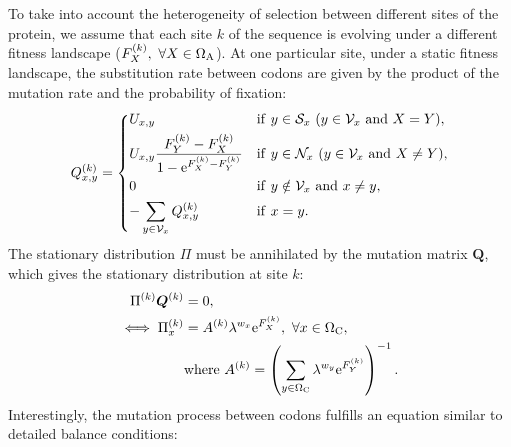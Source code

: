 To take into account the heterogeneity of selection between different sites of the protein, we assume that each site $k$ of the sequence is evolving under a different fitness landscape ($F_X^{(k)}, \ \forall X \in \Omega_{\mathrm{A}} $).
At one particular site, under a static fitness landscape, the \gls{substitution} rate between \glspl{codon} are given by the product of the mutation rate and the probability of fixation:
\begin{equation}
\label{codonSubRates}
Q_{x, y}^{(k)} =
\begin{dcases}
U_{x, y}
& \mathrm{if} \ y \in \mathcal{S}_x \ (y \in \mathcal{V}_x \ \mathrm{and} \ X = Y),  \\
U_{x, y} \dfrac{F_Y^{(k)} - F_X^{(k)}}{1 - \mathrm{e}^{F_X^{(k)} - F_Y^{(k)}}}
& \mathrm{if} \ y \in \mathcal{N}_x \ (y \in \mathcal{V}_x \ \mathrm{and} \ X \neq Y),  \\
0
& \mathrm{if} \  y \notin \mathcal{V}_x \ \mathrm{ and } \ x \neq y, \\
- \sum_{y \in \mathcal{V}_x }  Q_{x, y}^{(k)}
& \mathrm{if} \ x = y.  \\
\end{dcases}
\end{equation}
The stationary distribution $\Pi$ must be annihilated by the mutation matrix $\bm{Q}$, which gives the stationary distribution at site $k$:
\begin{align}
\Pi^{(k)} \bm{Q}^{(k)}
& =0 ,\\
\iff \Pi_x^{(k)}
& =A^{(k)} \lambda^{w_x} \mathrm{e}^{F_X^{(k)}} ,\ \forall x \in \Omega_{\mathrm{C}},\\
& \mathrm{ where } \ A^{(k)} = \left( \sum_{y \in \Omega_{\mathrm{C}}} \lambda^{w_y} \mathrm{e}^{F_Y^{(k)}} \right)^{-1}.
\label{codonStationarity}
\end{align}
Interestingly, the mutation process between \glspl{codon} fulfills an equation similar to detailed balance conditions:
